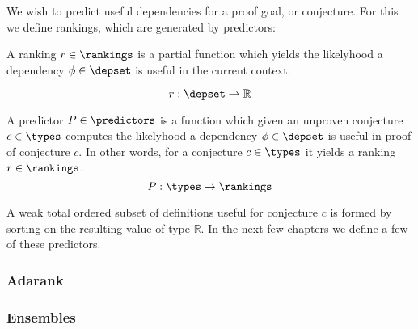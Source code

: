 We wish to predict useful dependencies for a proof goal, or conjecture.
For this we define rankings, which are generated by predictors:

\begin{definition}
  A ranking $r \in \rankings$ is a partial function which yields the likelyhood a
  dependency $\phi \in \depset$ is useful in the current context.

  $$
    r : \depset \rightharpoonup \mathbb{R}
  $$
\end{definition}

\begin{definition}
  A predictor $P \in \predictors$ is a function which given an unproven conjecture $c \in \types$
  computes the likelyhood a dependency $\phi \in \depset$ is useful in proof of conjecture $c$.
  In other words, for a conjecture $c \in \types$ it yields a ranking $r \in \rankings$.
  $$
    P : \types \rightarrow \rankings
  $$
\end{definition}

A weak total ordered subset of definitions useful for conjecture $c$ is formed by sorting on the resulting value of type $\mathbb{R}$.
In the next few chapters we define a few of these predictors.

\subsubsection{\knn}


\subsubsection{\knnadaptive}


\subsubsection{\nb}


\subsubsection{Adarank}


\subsubsection{Ensembles}


